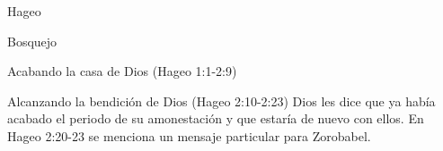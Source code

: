 \begin{section}{Hageo}
\begin{subsection}{Bosquejo}
\begin{subsubsection}{Acabando la casa de Dios (Hageo 1:1-2:9)}
		\end{subsubsection}
		\begin{subsubsection}{Alcanzando la bendición de Dios (Hageo 2:10-2:23)}
			Dios les dice que ya había acabado el periodo de su amonestación y que estaría de nuevo con ellos. En Hageo 2:20-23 se menciona un mensaje particular para Zorobabel.
		\end{subsubsection}
	\end{subsection}
\end{section}
%


